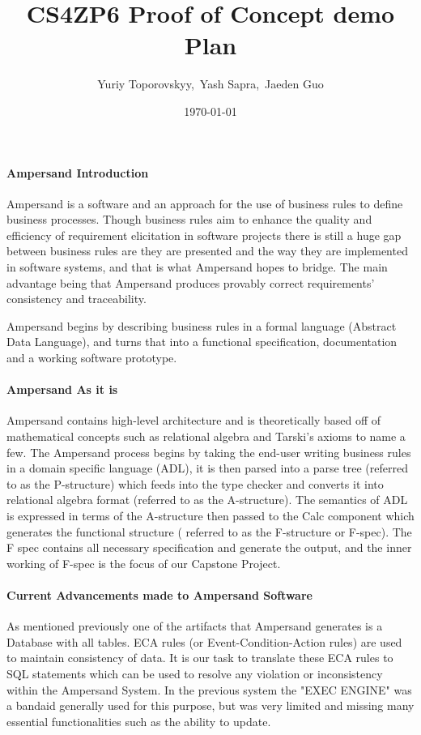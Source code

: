 \documentclass[12pt]{article}
\begin{document}
\title{CS4ZP6 Proof of Concept demo Plan\\ \vspace{2ex}} 
\author{\normalsize{Yuriy Toporovskyy,\ Yash Sapra,\ Jaeden Guo}}
\date{\normalsize\today \vspace{1ex}}
\thispagestyle{empty}
\maketitle
\paragraph{Ampersand Introduction}
Ampersand is a software and an approach for the use of business rules to define 
business processes. Though business rules aim to enhance the quality and 
efficiency of requirement elicitation in software projects there is still a 
huge gap between business rules are they are presented and the way they are 
implemented in software systems, and that is what Ampersand hopes to bridge. 
The main advantage being that Ampersand produces provably correct requirements' 
consistency and traceability.

Ampersand begins by describing business rules in a formal language 
\big(Abstract Data Language\big), and turns that into a functional 
specification, documentation and a working software prototype.   

\paragraph{Ampersand As it is}
Ampersand contains high-level architecture and is theoretically based off of 
mathematical concepts such as relational algebra and Tarski's axioms to name a 
few. The Ampersand process begins by taking the end-user writing business rules 
in a domain specific language \big(ADL\big), it is then parsed into a parse 
tree \big(referred to as the P-structure\big) which feeds into the type checker 
and converts it into relational algebra format \big(referred to as the 
A-structure\big). The semantics of ADL is expressed in terms of the A-structure 
then passed to the Calc component which generates the functional structure 
\big( referred to as the F-structure or F-spec\big). The F spec contains all 
necessary specification and generate the output, and the inner working of 
F-spec is the focus of our Capstone Project. 

\paragraph{Current Advancements made to Ampersand Software}
As mentioned previously one of the artifacts that Ampersand generates is a 
Database with all tables. ECA rules \big(or Event-Condition-Action rules\big) 
are used to maintain consistency of data. It is our task to translate these ECA 
rules to SQL statements which can be used to resolve any violation or 
inconsistency within the Ampersand System. In the previous system the "EXEC 
ENGINE" was a bandaid generally used for this purpose, but was very limited and 
missing many essential functionalities such as the ability to update. 
\end{document}
